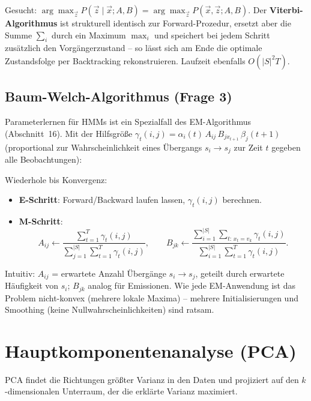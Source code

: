\documentclass[11pt]{article}
\theoremstyle{csthm}
\theoremstyle{csdef}
\begin{document}
Gesucht: $\arg\max_{\vec z} P(\vec z\mid \vec x;A,B) = \arg\max_{\vec z}
P(\vec x,\vec z;A,B)$. Der \textbf{Viterbi-Algorithmus} ist strukturell
identisch zur Forward-Prozedur, ersetzt aber die Summe $\sum_i$ durch ein
Maximum $\max_i$ und speichert bei jedem Schritt zusätzlich den
Vorgängerzustand -- so lässt sich am Ende die optimale Zustandsfolge per
Backtracking rekonstruieren. Laufzeit ebenfalls $O(|S|^2 T)$.

\subsection{Baum-Welch-Algorithmus (Frage 3)}

Parameterlernen für HMMs ist ein Spezialfall des EM-Algorithmus
(Abschnitt~16). Mit der Hilfsgröße
$\gamma_t(i,j) = \alpha_i(t)\,A_{ij}\,B_{jx_{t+1}}\,\beta_j(t{+}1)$
(proportional zur Wahrscheinlichkeit eines Übergangs $s_i\to s_j$ zur Zeit
$t$ gegeben alle Beobachtungen):

\begin{tcolorbox}[algostyle, title={Baum-Welch (Forward-Backward-EM)}]
Wiederhole bis Konvergenz:
\begin{itemize}[leftmargin=*, itemsep=1pt]
  \item \textbf{E-Schritt}: Forward/Backward laufen lassen, $\gamma_t(i,j)$ berechnen.
  \item \textbf{M-Schritt}:
    \[
      A_{ij} \leftarrow \frac{\sum_{t=1}^T \gamma_t(i,j)}{\sum_{j=1}^{|S|}\sum_{t=1}^T \gamma_t(i,j)}, \qquad
      B_{jk} \leftarrow \frac{\sum_{i=1}^{|S|}\sum_{t:\,x_t=v_k} \gamma_t(i,j)}{\sum_{i=1}^{|S|}\sum_{t=1}^T \gamma_t(i,j)}.
    \]
\end{itemize}
\end{tcolorbox}

Intuitiv: $A_{ij}$ = erwartete Anzahl Übergänge $s_i\to s_j$, geteilt durch
erwartete Häufigkeit von $s_i$; $B_{jk}$ analog für Emissionen. Wie jede
EM-Anwendung ist das Problem nicht-konvex (mehrere lokale Maxima) --
mehrere Initialisierungen und Smoothing (keine Nullwahrscheinlichkeiten)
sind ratsam.

\section{Hauptkomponentenanalyse (PCA)}

PCA findet die Richtungen größter Varianz in den Daten und projiziert auf
den $k$-dimensionalen Unterraum, der die erklärte Varianz maximiert.
\end{document}
